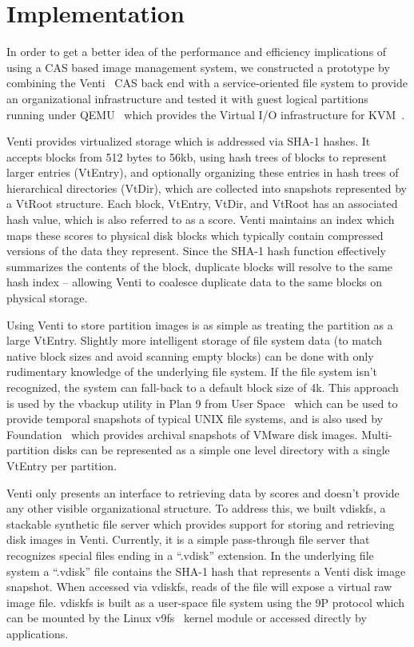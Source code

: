 \section{Implementation}

In order to get a better idea of the performance and efficiency implications 
of using a CAS based image management system, we constructed a prototype by
combining the Venti~\cite{venti} CAS back end with a service-oriented file 
system to provide an organizational infrastructure and tested it with 
guest logical partitions running under QEMU~\cite{qemu} which provides the
Virtual I/O infrastructure for KVM~\cite{kvm}. 

Venti provides virtualized storage which is addressed via SHA-1 hashes.
It accepts blocks from 512 bytes to 56kb, using hash trees of blocks to
represent larger entries (VtEntry), and optionally organizing these entries in 
hash trees of hierarchical directories (VtDir), which are collected into
snapshots represented by a VtRoot structure.
Each block, VtEntry, VtDir, and VtRoot has an associated hash value, which 
is also referred to as a score.  
Venti maintains an index which maps these scores to physical disk blocks
which typically contain compressed versions of the data they represent.
Since the SHA-1 hash function effectively summarizes the contents of the
block, duplicate blocks will resolve to the same hash index -- allowing 
Venti to coalesce duplicate data to the same blocks on physical storage.

Using Venti to store partition images is as simple as treating the partition
as a large VtEntry.
Slightly more intelligent storage of file system data (to match native block
sizes and avoid scanning empty blocks) can be done with only rudimentary 
knowledge of the underlying file system.
If the file system isn't recognized, the system can fall-back to a default
block size of 4k.
This approach is used by the vbackup utility in 
Plan 9 from User Space~\cite{plan9ports} which can be used to provide 
temporal snapshots of 
typical UNIX file systems, and is also used by Foundation~\cite{foundation}
which provides archival snapshots of VMware disk images.
Multi-partition disks can be represented as a simple one level directory 
with a single VtEntry per partition.  

Venti only presents an interface to retrieving data by scores and doesn't
provide any other visible organizational structure.  
To address this, we built vdiskfs, a stackable synthetic file server which 
provides support for storing and retrieving disk images in Venti.
Currently, it is a simple pass-through file server that recognizes special
files ending in a ``.vdisk'' extension. 
In the underlying file system a ``.vdisk'' file contains the SHA-1 hash that 
represents a Venti disk image snapshot.  
When accessed via vdiskfs, reads of the file will expose a virtual raw image
file.
vdiskfs is built as a user-space file system using the 9P protocol which can
be mounted by the Linux v9fs~\cite{graverobber} kernel module or accessed 
directly by applications.

